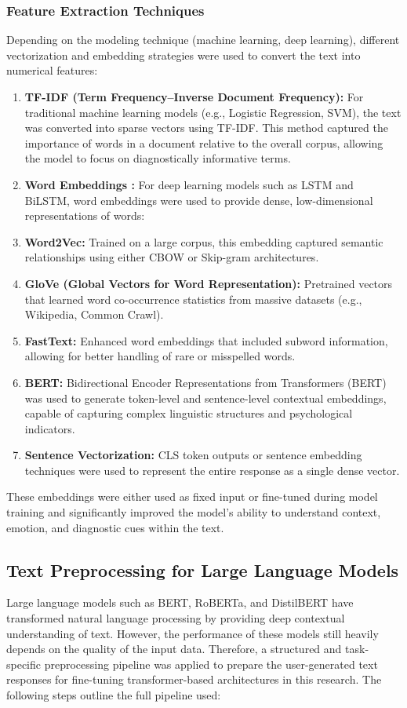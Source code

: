 \subsubsection{Feature Extraction Techniques}
Depending on the modeling technique (machine learning, deep learning), different vectorization and embedding strategies were used to convert the text into numerical features:
\begin{enumerate}

    \item \textbf{TF-IDF (Term Frequency–Inverse Document Frequency):} For traditional machine learning models (e.g., Logistic Regression, SVM), the text was converted into sparse vectors using TF-IDF. This method captured the importance of words in a document relative to the overall corpus, allowing the model to focus on diagnostically informative terms.
    \item \textbf{Word Embeddings :} For deep learning models such as LSTM and BiLSTM, word embeddings were used to provide dense, low-dimensional representations of words:
    \item \textbf{Word2Vec:} Trained on a large corpus, this embedding captured semantic relationships using either CBOW or Skip-gram architectures.
    \item \textbf{GloVe (Global Vectors for Word Representation):} Pretrained vectors that learned word co-occurrence statistics from massive datasets (e.g., Wikipedia, Common Crawl).
    \item \textbf{FastText:} Enhanced word embeddings that included subword information, allowing for better handling of rare or misspelled words.
    \item \textbf{BERT:} Bidirectional Encoder Representations from Transformers (BERT) was used to generate token-level and sentence-level contextual embeddings, capable of capturing complex linguistic structures and psychological indicators.
    \item \textbf{Sentence Vectorization:} CLS token outputs or sentence embedding techniques were used to represent the entire response as a single dense vector.
\end{enumerate}
These embeddings were either used as fixed input or fine-tuned during model training and  significantly improved the model’s ability to understand context, emotion, and diagnostic cues within the text.

\subsection{Text Preprocessing for Large Language Models}
Large language models such as BERT, RoBERTa, and DistilBERT have transformed natural language processing by providing deep contextual understanding of text. However, the performance of these models still heavily depends on the quality of the input data. Therefore, a structured and task-specific preprocessing pipeline was applied to prepare the user-generated text responses for fine-tuning transformer-based architectures in this research. The following steps outline the full pipeline used:

